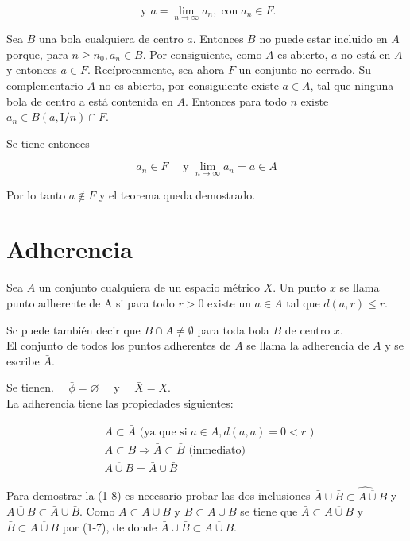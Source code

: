 \documentclass[10pt]{article}
\theoremstyle{plain}
\theoremstyle{definition}
\theoremstyle{remark}
\begin{document}
$$
\text { y } a=\lim _{n \rightarrow \infty} a_{n}, \operatorname{con} a_{n} \in F .
$$

Sea $B$ una bola cualquiera de centro $a$. Entonces $B$ no puede estar incluido en $A$ porque, para $n \geqslant n_{0}, a_{n} \in B$. Por consiguiente, como $A$ es abierto, $a$ no está en $A$ y entonces $a \in F$. Recíprocamente, sea ahora $F$ un conjunto no cerrado. Su complementario $A$ no es abierto, por consiguiente existe $a \in A$, tal que ninguna bola de centro a está contenida en $A$. Entonces para todo $n$ existe $a_{n} \in B(a, \mathrm{I} / n) \cap F$.

Se tiene entonces

$$
a_{n} \in F \quad \text { y } \lim _{n \rightarrow \infty} a_{n}=a \in A
$$

Por lo tanto $a \notin F$ y el teorema queda demostrado.

\section*{Adherencia}
Sea $A$ un conjunto cualquiera de un espacio métrico $X$. Un punto $x$ se llama punto adherente de A si para todo $r>0$ existe un $a \in A$ tal que $d(a, r) \leqslant r$.

Sc puede también decir que $B \cap A \neq \emptyset$ para toda bola $B$ de centro $x$.\\
El conjunto de todos los puntos adherentes de $A$ se llama la adherencia de $A$ y se escribe $\bar{A}$.

Se tienen. $\quad \bar{\phi}=\varnothing \quad$ y $\quad \bar{X}=X$.\\
La adherencia tiene las propiedades siguientes:


\begin{align*}
& A \subset \bar{A} \text { (ya que si } a \in A, d(a, a)=0<r \text { ) }  \tag{1-6}\\
& A \subset B \Rightarrow \bar{A} \subset \bar{B} \text { (inmediato) }  \tag{1.7}\\
& \overline{A \cup B}=\bar{A} \cup \bar{B} \tag{1-8}
\end{align*}


Para demostrar la (1-8) es necesario probar las dos inclusiones $\bar{A} \cup \bar{B} \widehat{\subset \overline{A \cup B}}$ y $\overline{A \cup B} \subset \bar{A} \cup \bar{B}$. Como $A \subset A \cup B$ y $B \subset A \cup B$ se tiene que $\bar{A} \subset \overline{A \cup B}$ y $\bar{B} \subset \overline{A \cup B}$ por (1-7), de donde $\bar{A} \cup \bar{B} \subset \overline{A \cup B}$.
\end{document}
